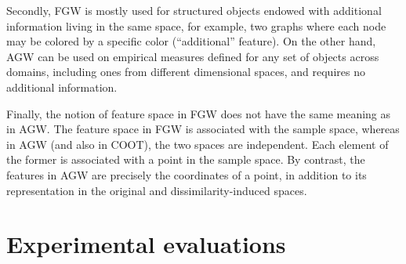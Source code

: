 Secondly, FGW is mostly used for structured objects endowed with additional information living
in the same space, for example, two graphs where each node may be colored by
a specific color (``additional'' feature). On the other hand, AGW can be used on
empirical measures defined for any set of objects across domains, including ones
from different dimensional spaces, and requires no additional information.

Finally, the notion of feature space in FGW does not have the same meaning as in AGW.
The feature space in FGW is associated with the sample space, whereas in AGW (and also in COOT),
the two spaces are independent. Each element of the former is
associated with a point in the sample space. By contrast, the features in AGW are
precisely the coordinates of a point, in addition to its representation in the
original and dissimilarity-induced spaces.

\section{Experimental evaluations}

